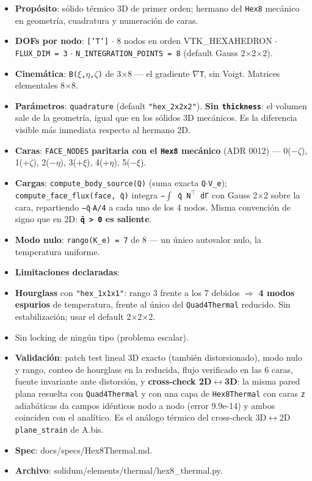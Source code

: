 \documentclass[11pt,letterpaper,oneside]{report}
\begin{document}
\begin{itemize}
  \item \textbf{Propósito}: sólido térmico 3D de primer orden; hermano del \texttt{Hex8} mecánico en geometría, cuadratura y numeración de caras.
  \item \textbf{DOFs por nodo}: \texttt{['T']} \ensuremath{\cdot} 8 nodos en orden VTK\_HEXAHEDRON \ensuremath{\cdot} \texttt{FLUX\_DIM = 3} \ensuremath{\cdot} \texttt{N\_INTEGRATION\_POINTS = 8} (default Gauss 2\ensuremath{\times}2\ensuremath{\times}2).
  \item \textbf{Cinemática}: \texttt{B(\ensuremath{\xi},\ensuremath{\eta},\ensuremath{\zeta})} de 3\ensuremath{\times}8 --- el gradiente \texttt{\ensuremath{\nabla}T}, sin Voigt. Matrices elementales 8\ensuremath{\times}8.
  \item \textbf{Parámetros}: \texttt{quadrature} (default \texttt{"hex\_2x2x2"}). \textbf{Sin \texttt{thickness}}: el volumen sale de la geometría, igual que en los sólidos 3D mecánicos. Es la diferencia visible más inmediata respecto al hermano 2D.
  \item \textbf{Caras}: \texttt{FACE\_NODES} \textbf{paritaria con el \texttt{Hex8} mecánico} (ADR 0012) --- 0(−\ensuremath{\zeta}), 1(+\ensuremath{\zeta}), 2(−\ensuremath{\eta}), 3(+\ensuremath{\xi}), 4(+\ensuremath{\eta}), 5(−\ensuremath{\xi}).
  \item \textbf{Cargas}: \texttt{compute\_body\_source(Q)} (suma exacta \texttt{Q\ensuremath{\cdot}V\_e}); \texttt{compute\_face\_flux(face, q̄)} integra \texttt{−\ensuremath{\int} q̄ N\ensuremath{^{\top}} dΓ} con Gauss 2\ensuremath{\times}2 sobre la cara, repartiendo \texttt{−q̄\ensuremath{\cdot}A/4} a cada uno de los 4 nodos. Misma convención de signo que en 2D: \textbf{\texttt{q̄ > 0} es saliente}.
  \item \textbf{Modo nulo}: \texttt{rango(K\_e) = 7} de 8 --- un único autovalor nulo, la temperatura uniforme.
  \item \textbf{Limitaciones declaradas}:
  \item \textbf{Hourglass} con \texttt{"hex\_1x1x1"}: rango 3 frente a los 7 debidos \ensuremath{\Rightarrow} \textbf{4 modos espurios} de temperatura, frente al único del \texttt{Quad4Thermal} reducido. Sin estabilización; usar el default 2\ensuremath{\times}2\ensuremath{\times}2.
  \item Sin locking de ningún tipo (problema escalar).
  \item \textbf{Validación}: patch test lineal 3D exacto (también distorsionado), modo nulo y rango, conteo de hourglass en la reducida, flujo verificado en las 6 caras, fuente invariante ante distorsión, y \textbf{cross-check 2D\ensuremath{\leftrightarrow}3D}: la misma pared plana resuelta con \texttt{Quad4Thermal} y con una capa de \texttt{Hex8Thermal} con caras \texttt{z} adiabáticas da campos idénticos nodo a nodo (error 9.9e-14) y ambos coinciden con el analítico. Es el análogo térmico del cross-check 3D\ensuremath{\leftrightarrow}2D \texttt{plane\_strain} de A.bis.
  \item \textbf{Spec}: docs/specs/Hex8Thermal.md.
  \item \textbf{Archivo}: solidum/elements/thermal/hex8\_thermal.py.
\end{itemize}
\end{document}
